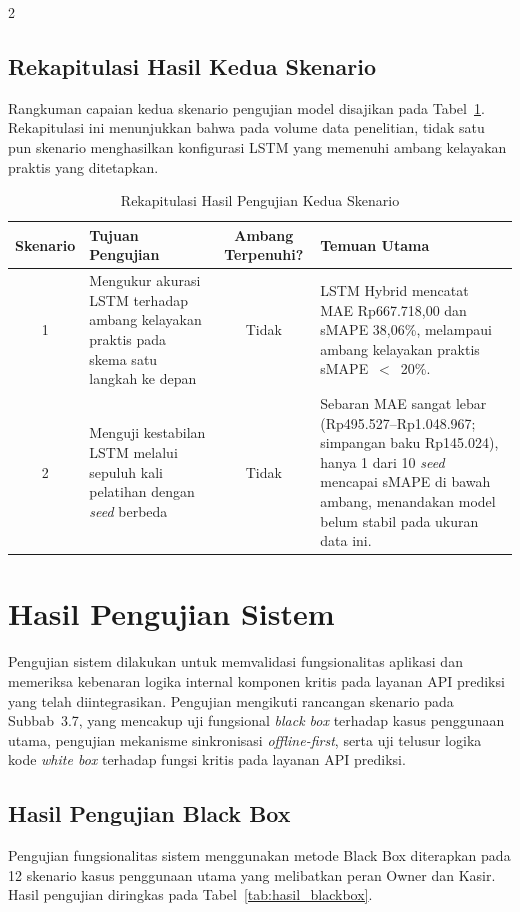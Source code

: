 \documentclass[12pt, a4paper, onecolumn, oneside]{report}
\begin{document}
\begin{spacing}{2}
\subsection{Rekapitulasi Hasil Kedua Skenario}
Rangkuman capaian kedua skenario pengujian model disajikan pada
Tabel~\ref{tab:rekap_skenario}. Rekapitulasi ini menunjukkan bahwa pada volume data
penelitian, tidak satu pun skenario menghasilkan konfigurasi LSTM yang memenuhi
ambang kelayakan praktis yang ditetapkan.
\begin{table}[H]
\centering
\caption{Rekapitulasi Hasil Pengujian Kedua Skenario}
\label{tab:rekap_skenario}
\begin{tabularx}{\textwidth}{|c|X|c|X|}
\hline
\textbf{Skenario} & \textbf{Tujuan Pengujian} & \textbf{Ambang Terpenuhi?} & \textbf{Temuan Utama} \\ \hline
1 & Mengukur akurasi LSTM terhadap ambang kelayakan praktis pada skema satu langkah ke depan
  & Tidak
  & LSTM Hybrid mencatat MAE Rp667.718,00 dan sMAPE 38,06\%, melampaui ambang
    kelayakan praktis sMAPE~$<$~20\%. \\ \hline
2 & Menguji kestabilan LSTM melalui sepuluh kali pelatihan dengan \textit{seed} berbeda
  & Tidak
  & Sebaran MAE sangat lebar (Rp495.527--Rp1.048.967; simpangan baku Rp145.024),
    hanya 1 dari 10 \textit{seed} mencapai sMAPE di bawah ambang, menandakan model
    belum stabil pada ukuran data ini. \\ \hline
\end{tabularx}
\end{table}

\section{Hasil Pengujian Sistem}
Pengujian sistem dilakukan untuk memvalidasi fungsionalitas aplikasi dan memeriksa kebenaran logika internal komponen kritis pada layanan API prediksi yang telah diintegrasikan. Pengujian mengikuti rancangan skenario pada Subbab~3.7, yang mencakup uji fungsional \textit{black box} terhadap kasus penggunaan utama, pengujian mekanisme sinkronisasi \textit{offline-first}, serta uji telusur logika kode \textit{white box} terhadap fungsi kritis pada layanan API prediksi.

\subsection{Hasil Pengujian Black Box}

Pengujian fungsionalitas sistem menggunakan metode Black Box diterapkan pada 12 skenario kasus penggunaan utama yang melibatkan peran Owner dan Kasir. Hasil pengujian diringkas pada Tabel~\ref{tab:hasil_blackbox}.


\end{spacing}
\end{document}
